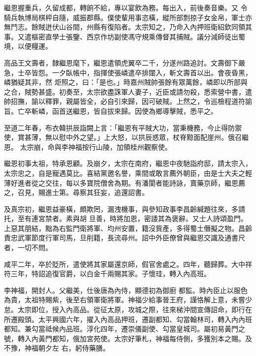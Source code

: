 \begin{pinyinscope}
 繼恩握重兵，久留成都，轉餉不給，專以宴飲為務。每出入，前後奏音樂。又
 令騎兵執博局棋枰自隨，威振郡縣。僕使輩用事恣橫，縱所部剽掠子女金帛，軍士亦無鬥志。餘賊迸伏山谷間，州縣有復陷者。太宗知之，乃命入內押班衛紹欽同領其事。又遣樞密直學士張鑒、西京作坊副使馮守規乘傳督其捕賊。議分減師徒出蜀境，以便糧運。



 高品王文壽者，隸繼恩麾下，繼恩遣領虎翼卒二千，分遂州路追討。文壽御下嚴急，士卒皆怨。一夕臥帳中，指揮使張嶙遣卒排闥入，斬文壽首以出。會夜昏黑，嶙猶疑其非，然
 炬照之，曰：「是也。」時嘉州賊帥張餘有眾萬餘，嶙即以所部與之合，賊勢甚盛。初奏至，太宗欲盡誅軍人妻子，近臣或請勿殺，悉索營中書，遣帥招撫，諭以釋罪，親屬皆全，必自引來歸，因可破賊。上然之，令巡檢程道符諭旨。亡卒斬嶙，函首送繼恩，皆自拔來歸。因使為鄉導擊賊，悉平之。



 至道二年春，布衣韓拱辰詣闕上言：「繼恩有平賊大功，當秉機務，今止得防禦使，賞甚薄，無以慰中外之望。」上大怒，以拱辰惑眾，杖脊黥面配崖州。俄召繼恩。
 太宗崩，命與李神福按行山陵，加領桂州觀察使。



 繼恩初事太祖，特承恩顧。及崩夕，太宗在南府，繼恩中夜馳詣府邸，請太宗入，太宗忠之，自是寵遇莫比。喜結黨邀名譽，乘間或敢言薦外朝臣，由是士大夫之輕薄好進者從之交往，每以多寶院僧舍為期。有潘閬者能詩詠，賣藥京師，繼恩薦之，召見，賜進士第。尋察其狂妄，追還詔書。



 及真宗初，繼恩益豪橫，頗欺罔，漏洩機事，與參知政事李昌齡緘題往來，多請托，至有連宮禁者。素與胡
 旦善，時將加恩，密諉其為褒辭。又士人詩頌盈門。上惡其朋結，黜為右監門衛將軍、均州安置，籍沒貲產，多得蜀土僭擬之物。昌齡責忠武軍節度行軍司馬，旦削籍，長流尋州。詔中外臣僚曾與繼恩交識及通書尺者，一切不問。



 咸平二年，卒於貶所，遣使將其家屬還京師，假官舍處之。四年，聽歸葬。大中祥符三年，特詔追復官爵，以白金千兩賜其家。子懷珪，轉入內高班。



 李神福，開封人。父繼美，仕後唐為內侍，顯德初為御廚
 都監。時內臣止以服色為貴，太祖特賜紫，後至右領軍衛將軍。神福少給事晉王府，謹恪解上意，未嘗少怠。太宗即位，授入內高品。從征太原，攻城之際，往來梯沖間宣傳詔命，即行在所遷殿頭。太平興國六年，擢入內高品押班，遷副都知、勾當翰林司，轉入內內班都知。兼勾當祗候內品班。淳化四年，遷崇儀副使、勾當皇城司。屬初易黃門之號，轉入內黃門都知，俄加宮苑使。太宗好筆札，神福每侍側，多獲別本之賜。及不豫，神福朝夕左
 右，躬侍藥膳。




\end{pinyinscope}
